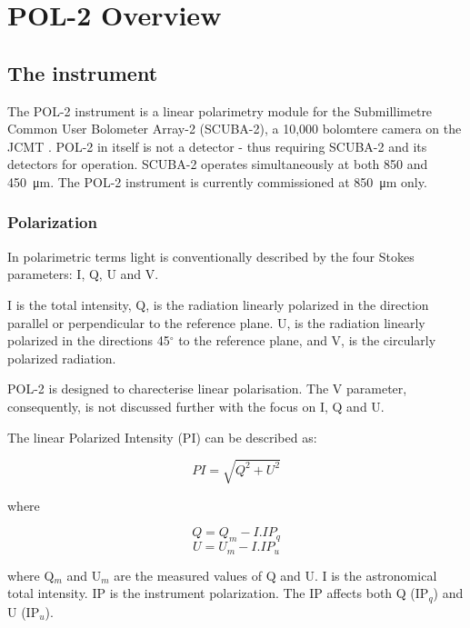 \chapter{POL-2 Overview}
\label{sec:pol2}
\section{The instrument}

The POL-2 instrument is a linear polarimetry module for the
Submillimetre Common User Bolometer Array-2 (SCUBA-2), a 10,000
bolomtere camera on the JCMT \cite{Friberg}\cite{Bastien2011}.
POL-2 in itself is not a detector - thus requiring SCUBA-2
and its detectors for operation. SCUBA-2 operates
simultaneously at both 850 and \SI{450}{\micro\metre}. The POL-2
instrument is currently commissioned at \SI{850}{\micro\metre} only.


\subsection*{Polarization}

In polarimetric terms light is conventionally 
described by the four Stokes parameters: I, Q, U and V.


I is the total intensity, Q, is the radiation linearly polarized in the
direction parallel or perpendicular to the reference plane. U, is the
radiation linearly polarized in the directions 45$^{\circ }$ to the
reference plane, and V, is the circularly polarized radiation.

POL-2 is designed to charecterise linear polarisation. 
The V parameter, consequently, is not discussed further
with the focus on I, Q and U.

The linear Polarized Intensity (PI) can be described as:

\begin{equation}
PI = \sqrt{Q^{2}+U^{2}}
\end{equation}

where

\begin{equation}
Q = Q_{m} - I . IP_{q}
\end{equation}
\begin{equation}
U = U_{m} - I . IP_{u}
\end{equation}

where Q$_{m}$ and U$_{m}$ are the measured values of Q and U.
I is the astronomical total intensity.
IP is the instrument polarization. The IP affects both Q
(IP$_{q}$) and U (IP$_{u}$).


